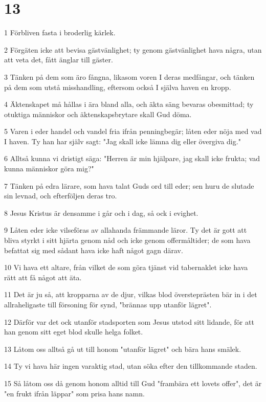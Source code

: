 \chapter{13}

\par 1 Förbliven fasta i broderlig kärlek.
\par 2 Förgäten icke att bevisa gästvänlighet; ty genom gästvänlighet hava några, utan att veta det, fått änglar till gäster.
\par 3 Tänken på dem som äro fångna, likasom voren I deras medfångar, och tänken på dem som utstå misshandling, eftersom också I själva haven en kropp.
\par 4 Äktenskapet må hållas i ära bland alla, och äkta säng bevaras obesmittad; ty otuktiga människor och äktenskapsbrytare skall Gud döma.
\par 5 Varen i eder handel och vandel fria ifrån penningbegär; låten eder nöja med vad I haven. Ty han har själv sagt: "Jag skall icke lämna dig eller övergiva dig."
\par 6 Alltså kunna vi dristigt säga: "Herren är min hjälpare, jag skall icke frukta; vad kunna människor göra mig?"
\par 7 Tänken på edra lärare, som hava talat Guds ord till eder; sen huru de slutade sin levnad, och efterföljen deras tro.
\par 8 Jesus Kristus är densamme i går och i dag, så ock i evighet.
\par 9 Låten eder icke vilseföras av allahanda främmande läror. Ty det är gott att bliva styrkt i sitt hjärta genom nåd och icke genom offermåltider; de som hava befattat sig med sådant hava icke haft något gagn därav.
\par 10 Vi hava ett altare, från vilket de som göra tjänst vid tabernaklet icke hava rätt att få något att äta.
\par 11 Det är ju så, att kropparna av de djur, vilkas blod översteprästen bär in i det allraheligaste till försoning för synd, "brännas upp utanför lägret".
\par 12 Därför var det ock utanför stadsporten som Jesus utstod sitt lidande, för att han genom sitt eget blod skulle helga folket.
\par 13 Låtom oss alltså gå ut till honom "utanför lägret" och bära hans smälek.
\par 14 Ty vi hava här ingen varaktig stad, utan söka efter den tillkommande staden.
\par 15 Så låtom oss då genom honom alltid till Gud "frambära ett lovets offer", det är "en frukt ifrån läppar" som prisa hans namn.
